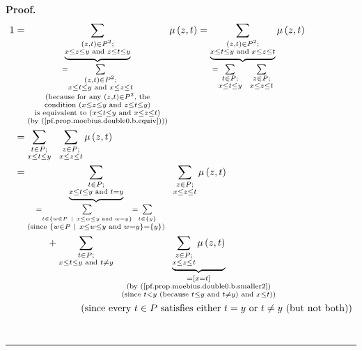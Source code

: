 \documentclass[numbers=enddot,12pt,final,onecolumn,notitlepage]{scrartcl}%
\theoremstyle{definition}
\newenvironment{proof}[1][Proof]{\noindent\textbf{#1.} }{\ \rule{0.5em}{0.5em}}
\newenvironment{verlong}{}{}
\let\sumnonlimits\sum
\renewcommand{\sum}{\sumnonlimits\limits}
\begin{document}
\begin{verlong}
\begin{proof}
\begin{align*}
1  &  =\underbrace{\sum_{\substack{\left(  z,t\right)  \in P^{2};\\x\leq z\leq
y\text{ and }z\leq t\leq y}}}_{\substack{=\sum_{\substack{\left(  z,t\right)
\in P^{2};\\x\leq t\leq y\text{ and }x\leq z\leq t}}\\\text{(because for any
}\left(  z,t\right)  \in P^{2}\text{, the}\\\text{condition }\left(  x\leq
z\leq y\text{ and }z\leq t\leq y\right)  \\\text{is equivalent to }\left(
x\leq t\leq y\text{ and }x\leq z\leq t\right)  \\\text{(by
(\ref{pf.prop.moebius.double0.b.equiv})))}}}\mu\left(  z,t\right)
=\underbrace{\sum_{\substack{\left(  z,t\right)  \in P^{2};\\x\leq t\leq
y\text{ and }x\leq z\leq t}}}_{=\sum_{\substack{t\in P;\\x\leq t\leq
y}}\ \ \sum_{\substack{z\in P;\\x\leq z\leq t}}}\mu\left(  z,t\right) \\
&  =\sum_{\substack{t\in P;\\x\leq t\leq y}}\ \ \sum_{\substack{z\in P;\\x\leq
z\leq t}}\mu\left(  z,t\right) \\
&  =\underbrace{\sum_{\substack{t\in P;\\x\leq t\leq y\text{ and }t=y}%
}}_{\substack{=\sum_{t\in\left\{  w\in P\ \mid\ x\leq w\leq y\text{ and
}w=y\right\}  }=\sum_{t\in\left\{  y\right\}  }\\\text{(since }\left\{  w\in
P\ \mid\ x\leq w\leq y\text{ and }w=y\right\}  =\left\{  y\right\}  \text{)}%
}}\ \ \sum_{\substack{z\in P;\\x\leq z\leq t}}\mu\left(  z,t\right) \\
&  \ \ \ \ \ \ \ \ \ \ +\sum_{\substack{t\in P;\\x\leq t\leq y\text{ and
}t\neq y}}\ \ \underbrace{\sum_{\substack{z\in P;\\x\leq z\leq t}}\mu\left(
z,t\right)  }_{\substack{=\left[  x=t\right]  \\\text{(by
(\ref{pf.prop.moebius.double0.b.smaller2})}\\\text{(since }t<y\text{ (because
}t\leq y\text{ and }t\neq y\text{) and }x\leq t\text{))}}}\\
&  \ \ \ \ \ \ \ \ \ \ \ \ \ \ \ \ \ \ \ \ \left(  \text{since every }t\in
P\text{ satisfies either }t=y\text{ or }t\neq y\text{ (but not both)}\right)
\\

\end{align*}
\end{proof}
\end{verlong}
\end{document}
